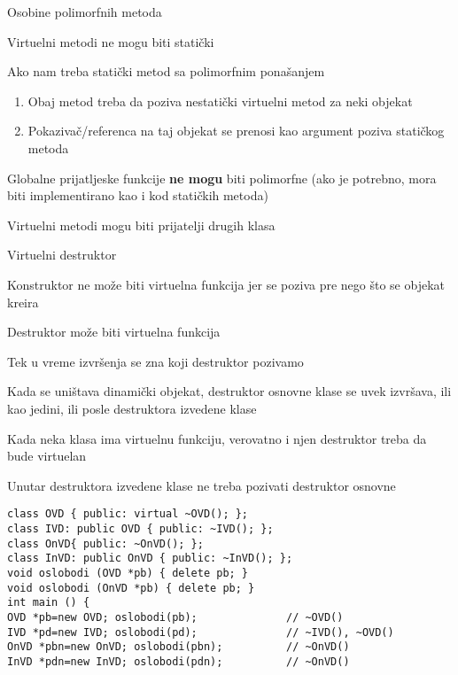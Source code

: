\documentclass{article}
\newenvironment{xitemize}{%
    
    \itemize
    \larger
}{%
    \enditemize
}
\let\olditemize\itemize
\let\endolditemize\enditemize
\renewenvironment{itemize}{%
    \smaller
    \olditemize
}{%
    \endolditemize
}
\begin{document}
\begin{xitemize}
\begin{itemize}
\begin{enumerate}
        \end{enumerate}
\end{itemize}
\item Osobine polimorfnih metoda
\begin{itemize}
    \item Virtuelni metodi ne mogu biti statički
    \item Ako nam treba statički metod sa polimorfnim ponašanjem
    \begin{enumerate}
        \item Obaj metod treba da poziva nestatički virtuelni metod za neki objekat
        \item Pokazivač/referenca na taj objekat se prenosi kao argument poziva statičkog metoda
    \end{enumerate}
    \item Globalne prijatljeske funkcije \textbf{ne mogu} biti polimorfne (ako je potrebno, mora biti implementirano kao i kod statičkih metoda)
    \item Virtuelni metodi mogu biti prijatelji drugih klasa
\end{itemize}
\item Virtuelni destruktor
\begin{itemize}
    \item Konstruktor ne može biti virtuelna funkcija jer se poziva pre nego što se objekat kreira
    \item Destruktor može biti virtuelna funkcija
    \item Tek u vreme izvršenja se zna koji destruktor pozivamo
    \item Kada se uništava dinamički objekat, destruktor osnovne klase se uvek izvršava, ili kao jedini, ili posle destruktora izvedene klase
    \item Kada neka klasa ima virtuelnu funkciju, verovatno i njen destruktor treba da bude virtuelan
    \item Unutar destruktora izvedene klase ne treba pozivati destruktor osnovne
    \begin{lstlisting}
class OVD { public: virtual ~OVD(); };
class IVD: public OVD { public: ~IVD(); };
class OnVD{ public: ~OnVD(); };
class InVD: public OnVD { public: ~InVD(); };
void oslobodi (OVD *pb) { delete pb; }
void oslobodi (OnVD *pb) { delete pb; }
int main () {
OVD *pb=new OVD; oslobodi(pb);              // ~OVD()
IVD *pd=new IVD; oslobodi(pd);              // ~IVD(), ~OVD()
OnVD *pbn=new OnVD; oslobodi(pbn);          // ~OnVD()
InVD *pdn=new InVD; oslobodi(pdn);          // ~OnVD()

\end{lstlisting}
\end{itemize}
\end{xitemize}
\end{document}
